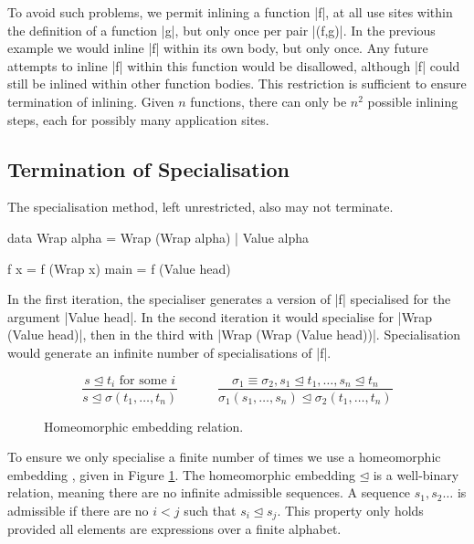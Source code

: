 \documentclass[preprint]{sigplanconf}
\begin{document}
To avoid such problems, we permit inlining a function |f|, at all use sites within the definition of a function |g|, but only once per pair |(f,g)|. In the previous example we would inline |f| within its own body, but only once. Any future attempts to inline |f| within this function would be disallowed, although |f| could still be inlined within other function bodies. This restriction is sufficient to ensure termination of inlining. Given $n$ functions, there can only be $n^2$ possible inlining steps, each for possibly many application sites.


\subsection{Termination of Specialisation}
\label{sec:termination_specialisation}

The specialisation method, left unrestricted, also may not terminate.

\begin{example}
\label{ex:wrap}
\begin{code}
data Wrap alpha = Wrap (Wrap alpha) | Value alpha

f x = f (Wrap x)
main = f (Value head)
\end{code}

In the first iteration, the specialiser generates a version of |f| specialised for the argument |Value head|. In the second iteration it would specialise for |Wrap (Value head)|, then in the third with |Wrap (Wrap (Value head))|. Specialisation would generate an infinite number of specialisations of |f|.
\end{example}

\begin{figure}
\begin{equation*}
\frac{s \unlhd t_i \text{ for some } i}{s \unlhd \sigma(t_1,\ldots,t_n)}
\;\;\;\;\;\;\;\;\;\;\;
\frac{\sigma_1 \equiv \sigma_2,
        s_1 \unlhd t_1, \ldots , s_n \unlhd t_n}
       {\sigma_1 (s_1,\ldots,s_n) \unlhd \sigma_2 (t_1,\ldots,t_n)}
\end{equation*}
\caption{Homeomorphic embedding relation.}
\label{fig:homeomorphic}
\end{figure}

To ensure we only specialise a finite number of times we use a homeomorphic embedding \cite{leuschel:homeomorphic}, given in Figure \ref{fig:homeomorphic}. The homeomorphic embedding $\unlhd$ is a well-binary relation, meaning there are no infinite admissible sequences. A sequence $s_1,s_2 \ldots$ is admissible if there are no $i < j$ such that $s_i \unlhd s_j$. This property only holds provided all elements are expressions over a finite alphabet.
\end{document}
